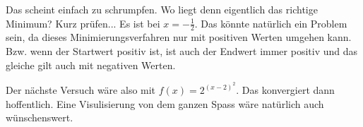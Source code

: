 \documentclass{article}
\begin{document}
Das scheint einfach zu schrumpfen. Wo liegt denn eigentlich das richtige Minimum? Kurz prüfen... Es ist bei $x=-\frac{1}{2}$. Das könnte natürlich ein Problem sein, da dieses Minimierungsverfahren nur mit positiven Werten umgehen kann. Bzw. wenn der Startwert positiv ist, ist auch der Endwert immer positiv und das gleiche gilt auch mit negativen Werten.

Der nächste Versuch wäre also mit $f(x)=2^{(x-2)^2}$. Das konvergiert dann hoffentlich. Eine Visulisierung von dem ganzen Spass wäre natürlich auch wünschenswert.
\end{document}
